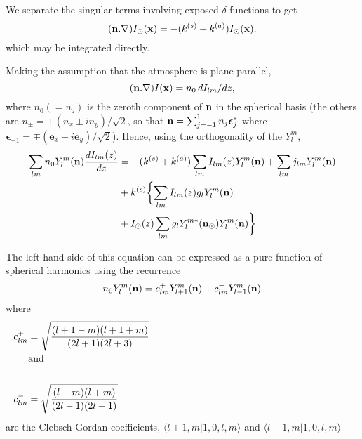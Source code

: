 We separate the singular terms involving exposed $\delta$-functions to get
\begin{equation}
( \mathbf{n} . \nabla) I_\odot (\mathbf{x}) = -(k^{(s)} + k^{(a)} ) I_\odot (\mathbf{x}).
\end{equation}
which may be integrated directly.

Making the assumption that the atmosphere is plane-parallel,
\begin{equation}
(\mathbf{n}.\nabla) I (\mathbf{x}) = n_0 \, dI_{lm}/dz,
\end{equation}
where $n_0(=n_z)$ is the zeroth component of $\mathbf{n}$ in the spherical
basis (the others are
$n_\pm=\mp (n_x \pm i n_y)/\sqrt{2}$, so that
$\mathbf{n} = \sum_{j=-1}^1 n_j \boldsymbol{\epsilon}_j^*$ where $\boldsymbol{
\epsilon}_{\pm 1}
= \mp ( \mathbf{e}_x \pm i \mathbf{e}_y )/\sqrt{2}$). Hence, using the
orthogonality of the $Y_l^m$,
\begin{equation}
\begin{split}
\sum_{lm} n_0 Y_l^m (\mathbf{n}) { {dI_{lm} (z)} \over {dz} } &= -(k^{(s)} + k^{(a)} )
\sum_{lm} I_{lm}(z) Y_l^m (\mathbf{n}) +\sum_{lm} j_{lm} Y_l^m (\mathbf{n}) \\
&+ k^{(s)} \biggl \{ \sum_{lm} I_{lm}(z) g_l Y_l^m (\mathbf{n}) \\
&+ I_\odot (z) \sum_{lm}
g_l Y_l^{m*} (\mathbf{n}_\odot) Y_l^m (\mathbf{n}) \biggr \}
\end{split}
\end{equation}

The left-hand side of this equation can be expressed as a pure function of
spherical harmonics using the recurrence
\begin{equation}
n_0 Y_l^m(\mathbf{n}) =c_{lm}^+ Y_{l+1}^m (\mathbf{n}) + c_{lm}^- Y_{l-1}^m (\mathbf{n})
\end{equation}
where
\begin{align}
c_{lm}^+ &= \sqrt{ { {(l+1-m)(l+1+m)} \over {(2l+1)(2l+3)} } } \\
\noalign{and} \\
c_{lm}^- &= \sqrt{ { {(l-m)(l+m)} \over {(2l-1)(2l+1)} } }
\end{align}
are the Clebsch-Gordan coefficients, $\langle l+1,m | 1,0,l,m\rangle$ and
$\langle l-1,m | 1,0,l,m\rangle$

